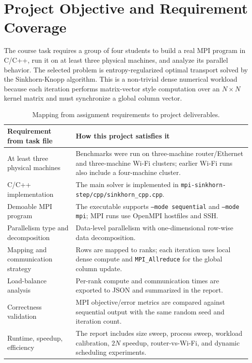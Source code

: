 \documentclass[12pt,a4paper]{article}
\begin{document}
\tableofcontents
\newpage

\section{Project Objective and Requirement Coverage}

The course task requires a group of four students to build a real MPI program in C/C++, run it on at least three physical machines, and analyze its parallel behavior. The selected problem is entropy-regularized optimal transport solved by the Sinkhorn-Knopp algorithm. This is a non-trivial dense numerical workload because each iteration performs matrix-vector style computation over an $N \times N$ kernel matrix and must synchronize a global column vector.

\begin{table}[H]
\centering
\begin{tabularx}{\linewidth}{P{4.2cm}Y}
\toprule
\textbf{Requirement from task file} & \textbf{How this project satisfies it} \\
\midrule
At least three physical machines & Benchmarks were run on three-machine router/Ethernet and three-machine Wi-Fi clusters; earlier Wi-Fi runs also include a four-machine cluster. \\
C/C++ implementation & The main solver is implemented in \texttt{mpi-sinkhorn-step/cpp/sinkhorn\_cpp.cpp}. \\
Demoable MPI program & The executable supports \texttt{--mode sequential} and \texttt{--mode mpi}; MPI runs use OpenMPI hostfiles and SSH. \\
Parallelism type and decomposition & Data-level parallelism with one-dimensional row-wise data decomposition. \\
Mapping and communication strategy & Rows are mapped to ranks; each iteration uses local dense compute and \texttt{MPI\_Allreduce} for the global column update. \\
Load-balance analysis & Per-rank compute and communication times are exported to JSON and summarized in the report. \\
Correctness validation & MPI objective/error metrics are compared against sequential output with the same random seed and iteration count. \\
Runtime, speedup, efficiency & The report includes size sweep, process sweep, workload calibration, $2N$ speedup, router-vs-Wi-Fi, and dynamic scheduling experiments. \\
\bottomrule
\end{tabularx}
\caption{Mapping from assignment requirements to project deliverables.}
\end{table}
\end{document}

